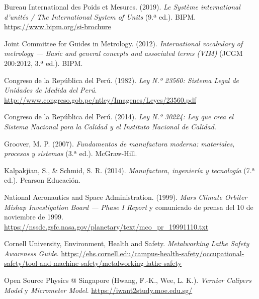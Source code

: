 \documentclass[12pt,a4paper]{article}
\begin{document}
\begin{enumerate}[label={[\arabic*]},ref=\arabic*,leftmargin=2.2em,itemsep=5pt]
	\item\label{b:si} Bureau International des Poids et Mesures. (2019). \emph{Le
		      Système international d'unités / The International System of Units}
	      (9.ª ed.).
	      BIPM. \url{https://www.bipm.org/si-brochure}
	\item\label{b:vim} Joint Committee for Guides in Metrology. (2012).
	      \emph{International vocabulary of metrology — Basic and general concepts
		      and
		      associated terms (VIM)} (JCGM 200:2012, 3.ª ed.). BIPM.
	\item\label{b:ley} Congreso de la República del Perú. (1982). \emph{Ley N.º
		      23560: Sistema Legal de Unidades de Medida del Perú}.
	      \url{http://www.congreso.gob.pe/ntley/Imagenes/Leyes/23560.pdf}
	\item\label{b:inacal} Congreso de la República del Perú. (2014). \emph{Ley N.º
		      30224: Ley que crea el Sistema Nacional para la Calidad y el Instituto
		      Nacional
		      de Calidad}.
	\item Groover, M. P. (2007). \emph{Fundamentos de manufactura moderna:
		      materiales, procesos y sistemas} (3.ª ed.). McGraw-Hill.
	\item Kalpakjian, S., \& Schmid, S. R. (2014). \emph{Manufactura, ingeniería y
		      tecnología} (7.ª ed.). Pearson Educación.
	\item National Aeronautics and Space Administration. (1999). \emph{Mars
		      Climate Orbiter Mishap Investigation Board — Phase I Report} y
	      comunicado de
	      prensa del 10 de noviembre de 1999.
	      \url{https://nssdc.gsfc.nasa.gov/planetary/text/mco_pr_19991110.txt}
	\item Cornell University, Environment, Health and Safety. \emph{Metalworking
		      Lathe Safety Awareness Guide}.
	      \url{https://ehs.cornell.edu/campus-health-safety/occupational-safety/tool-and-machine-safety/metalworking-lathe-safety}
	\item Open Source Physics @ Singapore (Hwang, F.-K., Wee, L. K.).
	      \emph{Vernier Calipers Model} y \emph{Micrometer Model}.
	      \url{https://iwant2study.moe.edu.sg/}
\end{enumerate}
\end{document}
